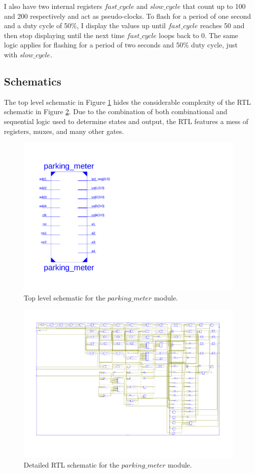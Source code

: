 \documentclass{article}
\begin{document}
I also have two internal registers $fast\_cycle$ and $slow\_cycle$ that count up to 100 and 200 respectively and act as pseudo-clocks. To flash for a period of one second and a duty cycle of 50\%, I display the values up until $fast\_cycle$ reaches 50 and then stop displaying until the next time $fast\_cycle$ loops back to 0. The same logic applies for flashing for a period of two seconds and 50\% duty cycle, just with $slow\_cycle$.

\pagebreak
\subsection{Schematics}
The top level schematic in Figure \ref{fig:schem_top} hides the considerable complexity of the RTL schematic in Figure \ref{fig:schem_detailed}. Due to the combination of both combinational and sequential logic used to determine states and output, the RTL features a mess of registers, muxes, and many other gates.
\begin{figure}[H]
    \centering
    \includegraphics[scale=0.42]{../figs/rtl-top.pdf}
    \caption{Top level schematic for the $parking\_meter$ module.}
    \label{fig:schem_top}
\end{figure}

\begin{figure}[H]
    \centering
    \includegraphics[scale=0.6]{../figs/rtl-low.pdf}
    \caption{Detailed RTL schematic for the $parking\_meter$ module.}
    \label{fig:schem_detailed}
\end{figure}
\end{document}
